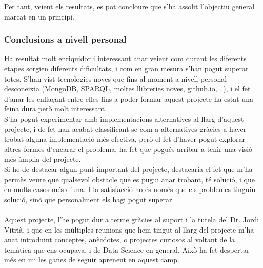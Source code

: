 \documentclass[12pt,a4paper,openright,oneside]{article}
\numberwithin{equation}{section}
\theoremstyle{definition}
\begin{document}
Per tant, veient els resultats, es pot concloure que s'ha assolit l'objectiu general marcat en un principi.\\
\subsubsection*{Conclusions a nivell personal}
Ha resultat molt enriquidor i interessant anar veient com durant les diferents etapes sorgien diferents dificultats, i com en gran mesura s'han pogut superar totes. S'han vist tecnologies noves que fins al moment a nivell personal desconeixia (MongoDB, SPARQL, moltes llibreries noves, github.io,...), i el fet d'anar-les enllaçant entre elles fins a poder formar aquest projecte ha estat una feina dura però molt interessant.\\
S'ha pogut experimentar amb implementacions alternatives al llarg d'aquest projecte, i de fet han acabat classificant-se com a alternatives gràcies a haver trobat alguna implementació més efectiva, però el fet d'haver pogut explorar altres formes d'encarar el problema, ha fet que pogués arribar a tenir una visió més àmplia del projecte.\\
Si he de destacar algun punt important del projecte, destacaria el fet que m'ha permès veure que qualsevol obstacle que es pugui anar trobant, té solució, i que en molts casos més d'una. I la satisfacció no és només que els problemes tinguin solució, sinó que personalment els hagi pogut superar.\\\\
Aquest projecte, l'he pogut dur a terme gràcies al suport i la tutela del Dr. Jordi Vitrià, i que en les múltiples reunions que hem tingut al llarg del projecte m'ha anat introduint conceptes, anècdotes, o projectes curiosos al voltant de la temàtica que ens ocupava, i de Data Science en general. Això ha fet despertar més en mi les ganes de seguir aprenent en aquest camp.
\end{document}
